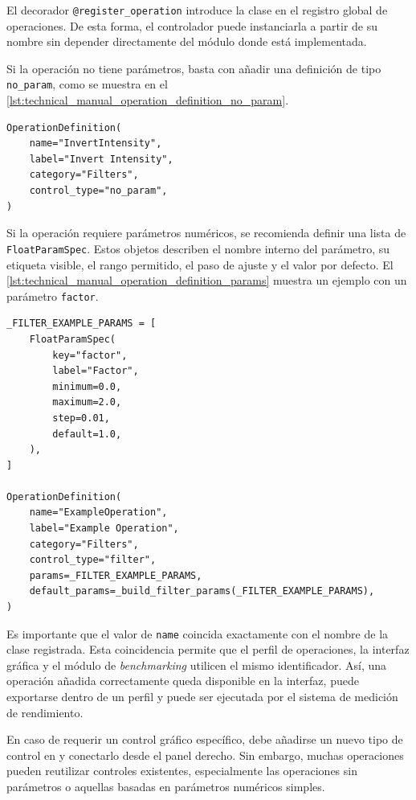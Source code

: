 El decorador \texttt{@register\_operation} introduce la clase en el registro global
de operaciones. De esta forma, el controlador puede instanciarla a partir de su
nombre sin depender directamente del módulo donde está implementada.

\newpage

Si la operación no tiene parámetros, basta con añadir una definición de tipo
\texttt{no\_param}, como se muestra en el
\autoref{lst:technical_manual_operation_definition_no_param}.

\begin{lstlisting}[style=pythonstyle, caption={Definición de operación sin parámetros}, label={lst:technical_manual_operation_definition_no_param}]
OperationDefinition(
    name="InvertIntensity",
    label="Invert Intensity",
    category="Filters",
    control_type="no_param",
)
\end{lstlisting}

Si la operación requiere parámetros numéricos, se recomienda definir una lista de
\texttt{FloatParamSpec}. Estos objetos describen el nombre interno del parámetro,
su etiqueta visible, el rango permitido, el paso de ajuste y el valor por defecto.
El \autoref{lst:technical_manual_operation_definition_params} muestra un ejemplo
con un parámetro \texttt{factor}.

\begin{lstlisting}[style=pythonstyle, caption={Definición de operación con parámetros}, label={lst:technical_manual_operation_definition_params}]
_FILTER_EXAMPLE_PARAMS = [
    FloatParamSpec(
        key="factor",
        label="Factor",
        minimum=0.0,
        maximum=2.0,
        step=0.01,
        default=1.0,
    ),
]

OperationDefinition(
    name="ExampleOperation",
    label="Example Operation",
    category="Filters",
    control_type="filter",
    params=_FILTER_EXAMPLE_PARAMS,
    default_params=_build_filter_params(_FILTER_EXAMPLE_PARAMS),
)
\end{lstlisting}

Es importante que el valor de \texttt{name} coincida exactamente con el nombre de
la clase registrada. Esta coincidencia permite que el perfil de operaciones, la
interfaz gráfica y el módulo de \textit{benchmarking} utilicen el mismo
identificador. Así, una operación añadida correctamente queda disponible en la
interfaz, puede exportarse dentro de un perfil y puede ser ejecutada por el
sistema de medición de rendimiento.

En caso de requerir un control gráfico específico, debe añadirse un nuevo tipo de
control en  y conectarlo desde el panel
derecho. Sin embargo, muchas operaciones pueden reutilizar controles existentes,
especialmente las operaciones sin parámetros o aquellas basadas en parámetros
numéricos simples.


